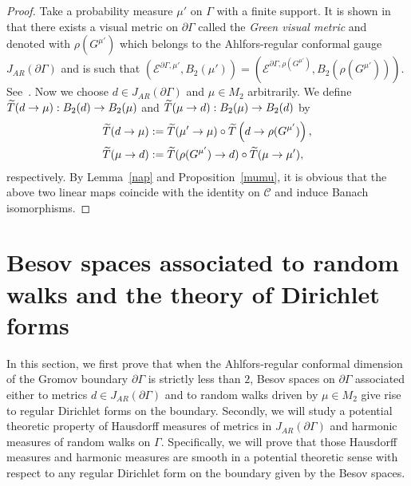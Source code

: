\documentclass[10pt]{amsart}
\theoremstyle{definition}\newtheorem{defi}[theo]{Definition}\newtheorem{rema}[theo]{Remark}\newtheorem{exam}[theo]{Example}\newtheorem{exem}[theo]{Example}\newtheorem{nota}[theo]{Notation}
\newcommand{\ce}{\mathcal{E}}
\newcommand{\cC}{\mathcal{C}}
\let\oldtilde\tilde
\renewcommand*{\tilde}[1]{\mathchoice{\widetilde{#1}}{\widetilde{#1}}{\oldtilde{#1}}{\oldtilde{#1}}}
\begin{document}
\begin{proof}
Take a probability measure $\mu'$ on $\Gamma$ with a finite support. It is shown in~\cite{BHM} that there exists a visual metric on $\partial\Gamma$ called the \emph{Green visual metric} and denoted with $\rho(G^{\mu'})$ which belongs to the Ahlfors-regular conformal gauge $J_{AR}(\partial\Gamma)$ and is such that $(\ce^{\partial\Gamma,\mu'},B_2(\mu'))=(\ce^{\partial\Gamma,\rho(G^{\mu'})},B_2(\rho(G^{\mu'})))$. See~\cite[Corollary~1.2 and Section~3.2]{BHM}. Now we choose $d\in J_{AR}(\partial\Gamma)$ and $\mu\in M_2$ arbitrarily. We define $\tilde{T}(d\rightarrow\mu): B_2(d)\rightarrow B_2(\mu)$ and $\tilde{T}(\mu\rightarrow d): B_2(\mu)\rightarrow B_2(d)$ by
\begin{align*}
\tilde{T}(d\rightarrow\mu)&:=\tilde{T}(\mu'\to\mu)\circ \tilde{T}\left(d\to \rho(G^{\mu'})\right),\\
\tilde{T}(\mu\rightarrow d)&:=\tilde{T}(\rho(G^{\mu'})\to d)\circ \tilde{T}(\mu\to\mu'),
\end{align*}
respectively. By Lemma~\ref{nap} and Proposition~\ref{mumu}, it is obvious that the above two linear maps coincide with the identity on $\cC$ and induce Banach isomorphisms.
\end{proof}

\section{Besov spaces associated to random walks and the theory of Dirichlet forms}\label{besov-rw}
In this section, we first prove that when the Ahlfors-regular conformal dimension of the Gromov boundary $\partial\Gamma$ is strictly less than $2$, Besov spaces on $\partial\Gamma$ associated either to metrics $d\in J_{AR}(\partial\Gamma)$ and to random walks driven by $\mu\in M_2$ give rise to regular Dirichlet forms on the boundary. Secondly, we will study a potential theoretic property of Hausdorff measures of metrics in $J_{AR}(\partial\Gamma)$ and harmonic measures of random walks on $\Gamma$. Specifically, we will prove that those Hausdorff measures and harmonic measures are smooth in a potential theoretic sense with respect to any regular Dirichlet form on the boundary given by the Besov spaces.
\end{document}
